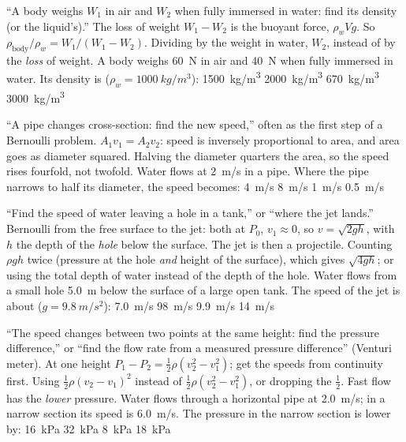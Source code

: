{``A body weighs $W_1$ in air and $W_2$ when fully immersed in water: find its density (or the liquid's).''}
{The loss of weight $W_1-W_2$ is the buoyant force, $\rho_wVg$. So
$\rho_{\text{body}}/\rho_w=W_1/(W_1-W_2)$.}
{Dividing by the weight in water, $W_2$, instead of by the \emph{loss} of weight.}
{A body weighs \SI{60}{N} in air and \SI{40}{N} when fully immersed in water. Its density is
($\rho_w=\SI{1000}{kg/m^3}$):}
{\SI{1500}{kg/m^3}}
{\SI{2000}{kg/m^3}}
{\SI{670}{kg/m^3}}
{\SI{3000}{kg/m^3}}

{``A pipe changes cross-section: find the new speed,'' often as the first step of a Bernoulli problem.}
{$A_1v_1=A_2v_2$: speed is inversely proportional to area, and area goes as diameter squared.}
{Halving the diameter quarters the area, so the speed rises fourfold, not twofold.}
{Water flows at \SI{2}{m/s} in a pipe. Where the pipe narrows to half its diameter, the speed becomes:}
{\SI{4}{m/s}}
{\SI{8}{m/s}}
{\SI{1}{m/s}}
{\SI{0.5}{m/s}}

{``Find the speed of water leaving a hole in a tank,'' or ``where the jet lands.''}
{Bernoulli from the free surface to the jet: both at $P_0$, $v_1\approx0$, so $v=\sqrt{2gh}$, with $h$ the
depth of the \emph{hole} below the surface. The jet is then a projectile.}
{Counting $\rho gh$ twice (pressure at the hole \emph{and} height of the surface), which gives
$\sqrt{4gh}$; or using the total depth of water instead of the depth of the hole.}
{Water flows from a small hole \SI{5.0}{m} below the surface of a large open tank. The speed of the jet is
about ($g=\SI{9.8}{m/s^2}$):}
{\SI{7.0}{m/s}}
{\SI{98}{m/s}}
{\SI{9.9}{m/s}}
{\SI{14}{m/s}}

{``The speed changes between two points at the same height: find the pressure difference,'' or ``find the
flow rate from a measured pressure difference'' (Venturi meter).}
{At one height $P_1-P_2=\tfrac12\rho(v_2^2-v_1^2)$; get the speeds from continuity first.}
{Using $\tfrac12\rho(v_2-v_1)^2$ instead of $\tfrac12\rho(v_2^2-v_1^2)$, or dropping the $\tfrac12$. Fast flow
has the \emph{lower} pressure.}
{Water flows through a horizontal pipe at \SI{2.0}{m/s}; in a narrow section its speed is \SI{6.0}{m/s}. The
pressure in the narrow section is lower by:}
{\SI{16}{kPa}}
{\SI{32}{kPa}}
{\SI{8}{kPa}}
{\SI{18}{kPa}}

